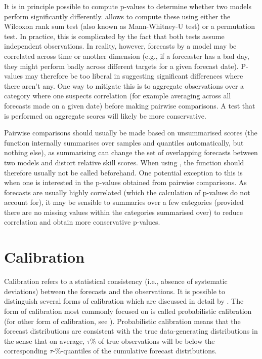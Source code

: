\documentclass[
]{jss}
\begin{document}
It is in principle possible to compute p-values to determine whether two
models perform significantly differently.  allows to
compute these using either the Wilcoxon rank sum test (also known as
Mann-Whitney-U test) \citep{mannTestWhetherOne1947} or a permutation
test. In practice, this is complicated by the fact that both tests
assume independent observations. In reality, however, forecasts by a
model may be correlated across time or another dimension (e.g., if a
forecaster has a bad day, they might perform badly across different
targets for a given forecast date). P-values may therefore be too
liberal in suggesting significant differences where there aren't any.
One way to mitigate this is to aggregate observations over a category
where one suspects correlation (for example averaging across all
forecasts made on a given date) before making pairwise comparisons. A
test that is performed on aggregate scores will likely be more
conservative.

Pairwise comparisons should usually be made based on unsummarised scores
(the function  internally summarises over
samples and quantiles automatically, but nothing else), as summarising
can change the set of overlapping forecasts between two models and
distort relative skill scores. When using ,
the function  should therefore usually not be
called beforehand. One potential exception to this is when one is
interested in the p-values obtained from pairwise comparisons. As
forecasts are usually highly correlated (which the calculation of
p-values do not account for), it may be sensible to summaries over a few
categories (provided there are no missing values within the categories
summarised over) to reduce correlation and obtain more conservative
p-values.

\section{Calibration}\label{calibration}

Calibration refers to a statistical consistency (i.e., absence of
systematic deviations) between the forecasts and the observations. It is
possible to distinguish several forms of calibration which are discussed
in detail by \cite{gneitingProbabilisticForecastsCalibration2007}. The
form of calibration most commonly focused on is called probabilistic
calibration (for other form of calibration, see
\cite{gneitingProbabilisticForecastsCalibration2007}). Probabilistic
calibration means that the forecast distributions are consistent with
the true data-generating distributions in the sense that on average,
\(\tau\)\% of true observations will be below the corresponding
\(\tau\)-\%-quantiles of the cumulative forecast distributions.
\end{document}
